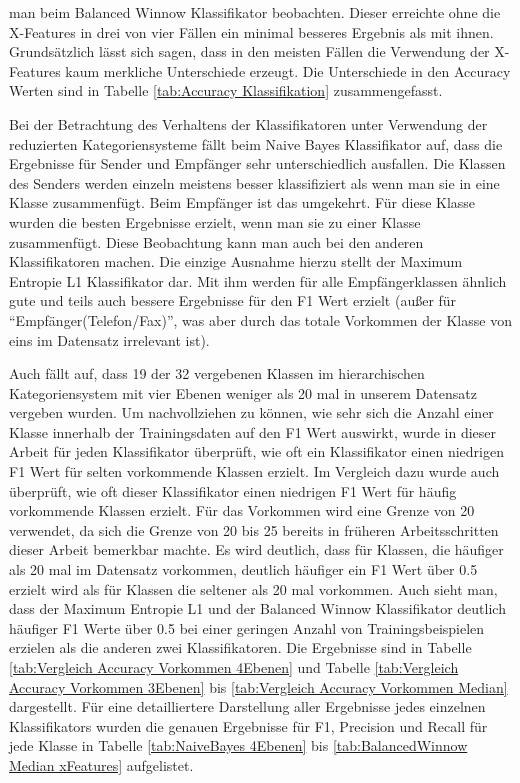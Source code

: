 man beim Balanced Winnow Klassifikator beobachten. Dieser erreichte ohne die X-Features in drei von vier Fällen ein minimal besseres Ergebnis als mit ihnen. Grundsätzlich lässt sich sagen, dass in den meisten Fällen die Verwendung der X-Features kaum merkliche Unterschiede erzeugt. Die Unterschiede in den Accuracy Werten sind in Tabelle \ref{tab:Accuracy Klassifikation} zusammengefasst.


Bei der Betrachtung des Verhaltens der Klassifikatoren unter Verwendung der reduzierten Kategoriensysteme fällt beim Naive Bayes Klassifikator auf, dass die Ergebnisse für Sender und Empfänger sehr unterschiedlich ausfallen. Die Klassen des Senders werden einzeln meistens besser klassifiziert als wenn man sie in eine Klasse zusammenfügt. Beim Empfänger ist das umgekehrt. Für diese Klasse wurden die besten Ergebnisse erzielt, wenn man sie zu einer Klasse zusammenfügt. Diese Beobachtung kann man auch bei den anderen Klassifikatoren machen. Die einzige Ausnahme hierzu stellt der Maximum Entropie L1 Klassifikator dar. Mit ihm werden für alle Empfängerklassen ähnlich gute und teils auch bessere Ergebnisse für den F1 Wert erzielt (außer für "`Empfänger(Telefon/Fax)"', was aber durch das totale Vorkommen der Klasse von eins im Datensatz irrelevant ist).

Auch fällt auf, dass 19 der 32 vergebenen Klassen im hierarchischen Kategoriensystem mit vier Ebenen weniger als 20 mal in unserem Datensatz vergeben wurden. Um nachvollziehen zu können, wie sehr sich die Anzahl einer Klasse innerhalb der Trainingsdaten auf den F1 Wert auswirkt, wurde in dieser Arbeit für jeden Klassifikator überprüft, wie oft ein Klassifikator einen niedrigen F1 Wert für selten vorkommende Klassen erzielt. Im Vergleich dazu wurde auch überprüft, wie oft dieser Klassifikator einen niedrigen F1 Wert für häufig vorkommende Klassen erzielt. Für das Vorkommen wird eine Grenze von 20 verwendet, da sich die Grenze von 20 bis 25 bereits in früheren Arbeitsschritten dieser Arbeit bemerkbar machte. Es wird deutlich, dass für Klassen, die häufiger als 20 mal im Datensatz vorkommen, deutlich häufiger ein F1 Wert über 0.5 erzielt wird als für Klassen die seltener als 20 mal vorkommen. Auch sieht man, dass der Maximum Entropie L1 und der Balanced Winnow Klassifikator deutlich häufiger F1 Werte über 0.5 bei einer geringen Anzahl von Trainingsbeispielen erzielen als die anderen zwei Klassifikatoren. Die Ergebnisse sind in Tabelle \ref{tab:Vergleich Accuracy Vorkommen 4Ebenen} und Tabelle \ref{tab:Vergleich Accuracy Vorkommen 3Ebenen} bis \ref{tab:Vergleich Accuracy Vorkommen Median} dargestellt. Für eine detailliertere Darstellung aller Ergebnisse jedes einzelnen Klassifikators wurden die genauen Ergebnisse für F1, Precision und Recall für jede Klasse in Tabelle \ref{tab:NaiveBayes 4Ebenen} bis \ref{tab:BalancedWinnow Median xFeatures} aufgelistet.